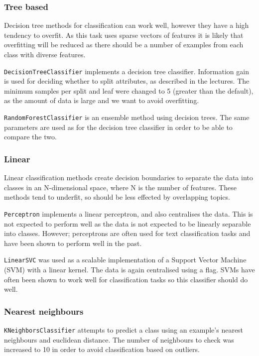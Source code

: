 \documentclass{article}
\begin{document}
\subsubsection{Tree based}
Decision tree methods for classification can work well, however they have a high tendency to overfit. As this task uses sparse vectors of features it is likely that overfitting will be reduced as there should be a number of examples from each class with diverse features.

\verb|DecisionTreeClassifier| implements a decision tree classifier. Information gain is used for deciding whether to split attributes, as described in the lectures. The minimum samples per split and leaf were changed to 5 (greater than the default), as the amount of data is large and we want to avoid overfitting.

\verb|RandomForestClassifier| is an ensemble method using decision trees. The same parameters are used as for the decision tree classifier in order to be able to compare the two.

\subsubsection{Linear}
Linear classification methods create decision boundaries to separate the data into classes in an N-dimensional space, where N is the number of features. These methods tend to underfit, so should be less effected by overlapping topics.

\verb|Perceptron| implements a linear perceptron, and also centralises the data. This is not expected to perform well as the data is not expected to be linearly separable into classes. However; perceptrons are often used for text classification tasks and have been shown to perform well in the past.

\verb|LinearSVC| was used as a scalable implementation of a Support Vector Machine (SVM) with a linear kernel. The data is again centralised using a flag. SVMs have often been shown to work well for classification tasks so this classifier should do well.

\subsubsection{Nearest neighbours}
\verb|KNeighborsClassifier| attempts to predict a class using an example's nearest neighbours and euclidean distance. The number of neighbours to check was increased to 10 in order to avoid classification based on outliers. 
\end{document}
